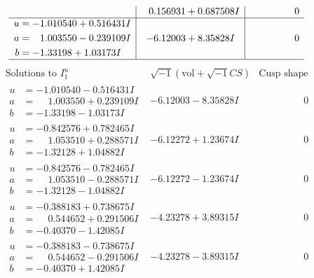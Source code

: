 \documentclass[1p]{elsarticle_modified}
\theoremstyle{definition}
\newcommand{\I}{\sqrt{-1}}
\begin{document}
$$\begin{array}{c|c|c}
 & \phantom{-}0.156931 + 0.687508 I & \phantom{-0.000000 } 0 \\ \hline\begin{aligned}
u &= -1.010540 + 0.516431 I \\
a &= \phantom{-}1.003550 - 0.239109 I \\
b &= -1.33198 + 1.03173 I\end{aligned}
 & -6.12003 + 8.35828 I & \phantom{-0.000000 } 0\\
 \hline 
 \end{array}$$\newpage$$\begin{array}{c|c|c}  
\text{Solutions to }I^u_{1}& \I (\text{vol} + \sqrt{-1}CS) & \text{Cusp shape}\\
 \hline 
\begin{aligned}
u &= -1.010540 - 0.516431 I \\
a &= \phantom{-}1.003550 + 0.239109 I \\
b &= -1.33198 - 1.03173 I\end{aligned}
 & -6.12003 - 8.35828 I & \phantom{-0.000000 } 0 \\ \hline\begin{aligned}
u &= -0.842576 + 0.782465 I \\
a &= \phantom{-}1.053510 + 0.288571 I \\
b &= -1.32128 + 1.04882 I\end{aligned}
 & -6.12272 + 1.23674 I & \phantom{-0.000000 } 0 \\ \hline\begin{aligned}
u &= -0.842576 - 0.782465 I \\
a &= \phantom{-}1.053510 - 0.288571 I \\
b &= -1.32128 - 1.04882 I\end{aligned}
 & -6.12272 - 1.23674 I & \phantom{-0.000000 } 0 \\ \hline\begin{aligned}
u &= -0.388183 + 0.738675 I \\
a &= \phantom{-}0.544652 + 0.291506 I \\
b &= -0.40370 - 1.42085 I\end{aligned}
 & -4.23278 + 3.89315 I & \phantom{-0.000000 } 0 \\ \hline\begin{aligned}
u &= -0.388183 - 0.738675 I \\
a &= \phantom{-}0.544652 - 0.291506 I \\
b &= -0.40370 + 1.42085 I\end{aligned}
 & -4.23278 - 3.89315 I & \phantom{-0.000000 } 0 \\ \hline\begin{aligned}

\end{aligned}
\end{array}$$
\end{document}
